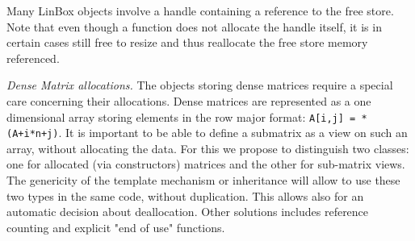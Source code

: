 \documentclass[runningheads,a4paper]{llncs}
\newcommand{\linbox}{{\sc LinBox}\xspace}
\begin{document}
Many \linbox objects involve a handle containing a reference to the free store.
Note that even though a function does not allocate the handle itself,
it is in certain cases still free to resize and thus reallocate the free store memory referenced.


{\em Dense Matrix allocations.}
The objects storing dense matrices require a special care
concerning their allocations. Dense matrices are represented as a one
dimensional array storing elements in the row major format:
\texttt{A[i,j] = *(A+i*n+j)}.  It is important to be 
able to define a submatrix as a view on such an array, without
allocating the data.
For this we propose to distinguish two classes: one for allocated (via
constructors) matrices and the other for sub-matrix views. The 
genericity of  the template mechanism or inheritance will allow to use
these two types in the same code, without duplication. This allows
also for an automatic decision about deallocation.
Other solutions includes reference counting and explicit "end of use"
functions.



\end{document}
